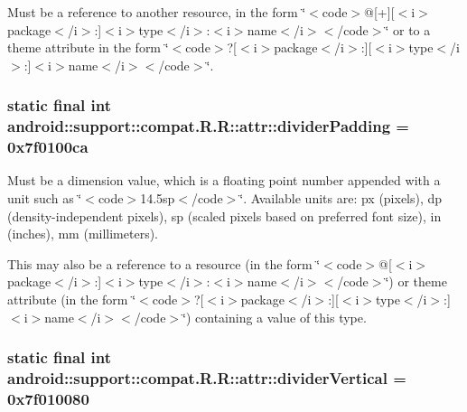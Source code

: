 Must be a reference to another resource, in the form \char`\"{}$<$code$>$@\mbox{[}+\mbox{]}\mbox{[}$<$i$>$package$<$/i$>$:\mbox{]}$<$i$>$type$<$/i$>$:$<$i$>$name$<$/i$>$$<$/code$>$\char`\"{} or to a theme attribute in the form \char`\"{}$<$code$>$?\mbox{[}$<$i$>$package$<$/i$>$:\mbox{]}\mbox{[}$<$i$>$type$<$/i$>$:\mbox{]}$<$i$>$name$<$/i$>$$<$/code$>$\char`\"{}. \hypertarget{classandroid_1_1support_1_1compat_1_1_r_1_1attr_4db238007142dfd45651579a8782748e}{
\subsubsection[{dividerPadding}]{\setlength{\rightskip}{0pt plus 5cm}static final int android::support::compat.R.R::attr::dividerPadding = 0x7f0100ca}}
\label{classandroid_1_1support_1_1compat_1_1_r_1_1attr_4db238007142dfd45651579a8782748e}


Must be a dimension value, which is a floating point number appended with a unit such as \char`\"{}$<$code$>$14.5sp$<$/code$>$\char`\"{}. Available units are: px (pixels), dp (density-independent pixels), sp (scaled pixels based on preferred font size), in (inches), mm (millimeters). 

This may also be a reference to a resource (in the form \char`\"{}$<$code$>$@\mbox{[}$<$i$>$package$<$/i$>$:\mbox{]}$<$i$>$type$<$/i$>$:$<$i$>$name$<$/i$>$$<$/code$>$\char`\"{}) or theme attribute (in the form \char`\"{}$<$code$>$?\mbox{[}$<$i$>$package$<$/i$>$:\mbox{]}\mbox{[}$<$i$>$type$<$/i$>$:\mbox{]}$<$i$>$name$<$/i$>$$<$/code$>$\char`\"{}) containing a value of this type. \hypertarget{classandroid_1_1support_1_1compat_1_1_r_1_1attr_ddcd20900772f8003c39c08b9d5d259c}{
\subsubsection[{dividerVertical}]{\setlength{\rightskip}{0pt plus 5cm}static final int android::support::compat.R.R::attr::dividerVertical = 0x7f010080}}
\label{classandroid_1_1support_1_1compat_1_1_r_1_1attr_ddcd20900772f8003c39c08b9d5d259c}


